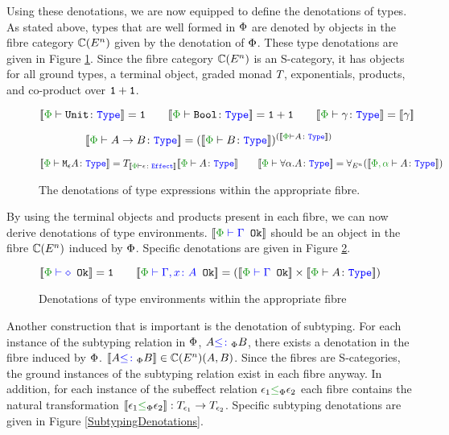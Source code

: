 \documentclass{Report}
\begin{document}
Using these denotations, we are now equipped to define the denotations of types. As stated above, types that are well formed in $\P$ are denoted by objects in the fibre category $\C(E^n)$ given by the denotation of $\P$. These type denotations are given in Figure \ref{TypeDenotations}. Since the fibre category $\C(E^n)$ is an S-category, it has objects for all ground types, a terminal object, graded monad $\T{}{}$, exponentials, products, and co-product over $\1+\1$.

\begin{figure}[H]
    \centering
    \begin{framed}
\[
    \deno{\typerelation{\P}{\U}{\type}} = \1
    \quad\quad
    \deno{\typerelation{\P}{\B}{\type}} = \1+\1
    \quad\quad
    \deno{\typerelation{\P}{\g}{\type}} = \deno{\g}
\] 

\[
    \deno{\typerelation{\P}{\ab}{\type}} = (\deno{\typerelation{\P}{B}{\type}})^{(\deno{\typerelation{\P}{A}{\type}})}
\]

\[
    \deno{\typerelation{\P}{\mea}{\type}} =\T{\deno{\typerelation{\P}{\e}{\effect}}}{\deno{\typerelation{\P}{A}{\type}}}
    \quad\quad
    \deno{\typerelation{\P}{\all{\a}{A}}{\type}} =\allEn(\deno{\typerelation{\P,\a}{A}{\type}})
\]


    \end{framed}
    \caption{The denotations of type expressions within the appropriate fibre.}
    \label{TypeDenotations}
\end{figure}

By using the terminal objects and products present in each fibre, we can now derive denotations of type environments. $\deno{\oke{\P}{\G}}$ should be an object in the fibre $\C(E^n)$ induced by $\P$. Specific denotations are given in Figure \ref{TypeEnvDenotations}.

\begin{figure}[H]
    \centering
    \begin{framed}
        \[
            \deno{\wellformedok{\P}{\nil}} = \1
            \quad\quad
            \deno{\wellformedok{\P}{\gax}} = (\deno{\wellformedok{\P}{\G}} \times \deno{\typerelation{\P}{A}{\type}})
        \]  
    \end{framed}

    \caption{Denotations of type environments within the appropriate fibre}
    \label{TypeEnvDenotations}
\end{figure}


Another construction that is important is the denotation of subtyping. For each instance of the subtyping relation in $\P$, $A\subtypep B$, there exists a denotation in the fibre induced by $\P$. $\deno{A\subtypep B} \in\C(E^n)(A, B)$. Since the fibres are S-categories, the ground instances of the subtyping relation exist in each fibre anyway. In addition, for each instance of the subeffect relation $\e_1\subeffectp \e_2$ each fibre contains the natural transformation $\dsep{\e_1}{\e_2}: \T{\e_1}{}\rightarrow \T{\e_2}{}$. Specific subtyping denotations are given in Figure \ref{SubtypingDenotations}.
\end{document}
